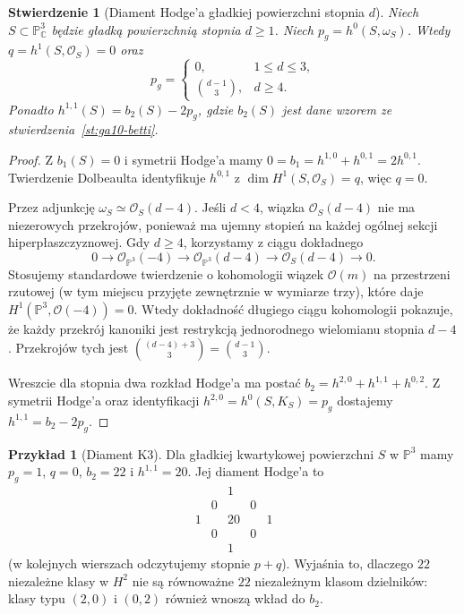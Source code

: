 \documentclass[11pt,a4paper,openany]{report}
\numberwithin{equation}{section}
\theoremstyle{plain}
\newtheorem{stwierdzenie}[twierdzenie]{Stwierdzenie}
\theoremstyle{definition}
\newtheorem{przyklad}[twierdzenie]{Przykład}
\theoremstyle{remark}
\newcommand{\C}{\mathbb C}
\newcommand{\PP}{\mathbb P}
\begin{document}
\begin{stwierdzenie}[Diament Hodge'a gładkiej powierzchni stopnia $d$]
\label{st:ga10-hodge-hypersurf}
Niech $S\subset\PP^3_\C$ będzie gładką powierzchnią
stopnia $d\ge1$. Niech $p_g=h^0(S,\omega_S)$.
Wtedy $q=h^1(S,\mathcal O_S)=0$ oraz
\[
 p_g=\begin{cases}0,&1\le d\le3,\\
 \binom{d-1}{3},&d\ge4.\end{cases}
\]
Ponadto $h^{1,1}(S)=b_2(S)-2p_g$, gdzie
$b_2(S)$ jest dane wzorem ze
stwierdzenia~\ref{st:ga10-betti}.
\end{stwierdzenie}
\begin{proof}
Z $b_1(S)=0$ i symetrii Hodge'a mamy
$0=b_1=h^{1,0}+h^{0,1}=2h^{0,1}$.
Twierdzenie Dolbeaulta identyfikuje
$h^{0,1}$ z $\dim H^1(S,\mathcal O_S)=q$,
więc $q=0$.

Przez adjunkcję $\omega_S\simeq\mathcal O_S(d-4)$.
Jeśli $d<4$, wiązka $\mathcal O_S(d-4)$ nie ma
niezerowych przekrojów, ponieważ ma ujemny stopień
na każdej ogólnej sekcji hiperpłaszczyznowej.
Gdy $d\ge4$, korzystamy z ciągu dokładnego
\[
 0\to\mathcal O_{\PP^3}(-4)\longrightarrow
 \mathcal O_{\PP^3}(d-4)\longrightarrow
 \mathcal O_S(d-4)\to0.
\]
Stosujemy standardowe twierdzenie o kohomologii wiązek
$\mathcal O(m)$ na przestrzeni rzutowej (w tym miejscu
przyjęte zewnętrznie w wymiarze trzy), które daje
$H^1(\PP^3,\mathcal O(-4))=0$. Wtedy dokładność
długiego ciągu kohomologii pokazuje, że każdy przekrój
kanoniki jest restrykcją jednorodnego wielomianu
stopnia $d-4$. Przekrojów tych jest
$\binom{(d-4)+3}{3}=\binom{d-1}{3}$.

Wreszcie dla stopnia dwa rozkład Hodge'a ma postać
$b_2=h^{2,0}+h^{1,1}+h^{0,2}$.
Z symetrii Hodge'a oraz identyfikacji
$h^{2,0}=h^0(S,K_S)=p_g$ dostajemy
$h^{1,1}=b_2-2p_g$.
\end{proof}

\begin{przyklad}[Diament K3]
Dla gładkiej kwartykowej powierzchni $S$ w $\PP^3$
mamy $p_g=1$, $q=0$, $b_2=22$ i $h^{1,1}=20$.
Jej diament Hodge'a to
\[
 \begin{array}{ccccc}
 &&1&&\\
 &0&&0&\\
 1&&20&&1\\
 &0&&0&\\
 &&1&&
 \end{array}
\]
(w kolejnych wierszach odczytujemy stopnie $p+q$).
Wyjaśnia to, dlaczego $22$ niezależne klasy w $H^2$
nie są równoważne $22$ niezależnym klasom dzielników:
klasy typu $(2,0)$ i $(0,2)$ również wnoszą wkład do $b_2$.
\end{przyklad}
\end{document}
